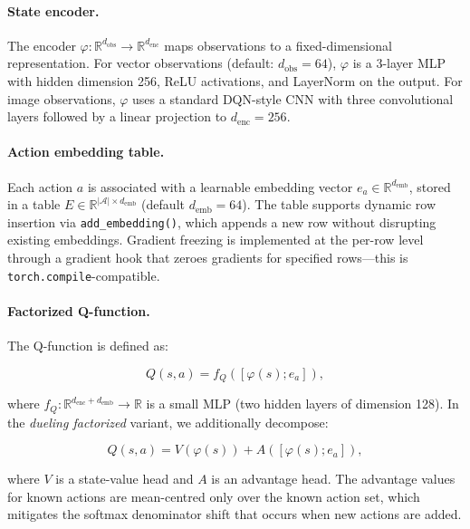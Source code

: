 \documentclass{article}
\begin{document}
\paragraph{State encoder.} The encoder
$\varphi: \mathbb{R}^{d_\text{obs}} \to \mathbb{R}^{d_\text{enc}}$ maps
observations to a fixed-dimensional representation. For vector observations
(default: $d_\text{obs}=64$), $\varphi$ is a 3-layer MLP with hidden dimension
256, ReLU activations, and LayerNorm on the output. For image observations,
$\varphi$ uses a standard DQN-style CNN with three convolutional layers
followed by a linear projection to $d_\text{enc}=256$.

\paragraph{Action embedding table.} Each action $a$ is associated with a
learnable embedding vector $e_a \in \mathbb{R}^{d_\text{emb}}$, stored in a
table $E \in \mathbb{R}^{|\mathcal{A}| \times d_\text{emb}}$ (default
$d_\text{emb}=64$). The table supports dynamic row insertion via
\texttt{add\_embedding()}, which appends a new row without disrupting existing
embeddings. Gradient freezing is implemented at the per-row level through a
gradient hook that zeroes gradients for specified rows---this is
\texttt{torch.compile}-compatible.

\paragraph{Factorized Q-function.} The Q-function is defined as:

\begin{equation}
Q(s,a) = f_Q([\varphi(s); e_a]), \label{eq:factorized}
\end{equation}

where $f_Q: \mathbb{R}^{d_\text{enc} + d_\text{emb}} \to \mathbb{R}$ is a
small MLP (two hidden layers of dimension 128). In the \emph{dueling
factorized} variant, we additionally decompose:

\begin{equation}
Q(s,a) = V(\varphi(s)) + A([\varphi(s); e_a]), \label{eq:dueling}
\end{equation}

where $V$ is a state-value head and $A$ is an advantage head. The advantage
values for known actions are mean-centred only over the known action set,
which mitigates the softmax denominator shift that occurs when new actions are
added.
\end{document}
